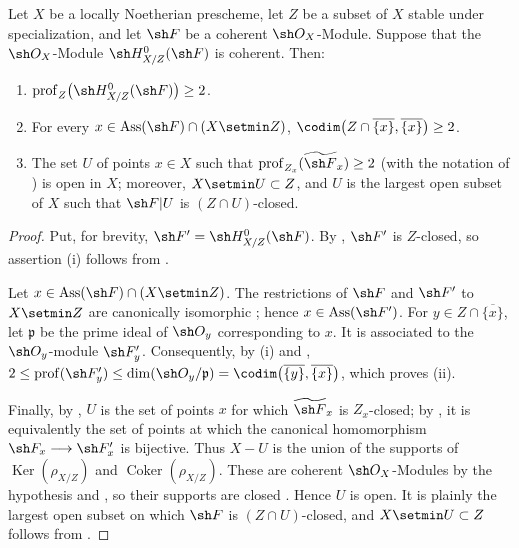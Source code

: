 \begin{proposition}[5.10.10]
\label{IV.5.10.10}
Let $X$ be a locally Noetherian prescheme, let $Z$ be a subset of
$X$ stable under specialization, and let $\sh F$ be a coherent
$\sh O_X$-Module.  Suppose that the $\sh O_X$-Module
$\sh H^0_{X/Z}(\sh F)$ is coherent.  Then:
\begin{enumerate}[{\rm(i)}]
  \item $\operatorname{prof}_Z\bigl(\sh H^0_{X/Z}(\sh F)\bigr)\geq2$.
  \item For every
  $x\in\operatorname{Ass}(\sh F)\cap(X\setmin Z)$, $\codim\bigl(Z\cap\overline{\{x\}},\overline{\{x\}}\bigr)
\geq2$.
  \item The set $U$ of points $x\in X$ such that $\operatorname{prof}_{Z_x}(\widetilde{\sh F}_x)\geq2$
  \textup{(with the notation of )} is open in $X$;
  moreover, $X\setmin U\subset Z$, and $U$ is the largest open subset of
  $X$ such that $\sh F|U$ is $(Z\cap U)$-closed.
\end{enumerate}
\end{proposition}


\begin{proof}
Put, for brevity, $\sh F'=\sh H^0_{X/Z}(\sh F)$.
By , $\sh F'$ is $Z$-closed, so assertion
{\rm(i)} follows from .

Let $x\in\operatorname{Ass}(\sh F)\cap(X\setmin Z)$.  The restrictions of
$\sh F$ and $\sh F'$ to $X\setmin Z$ are canonically isomorphic
; hence $x\in\operatorname{Ass}(\sh F')$.
For $y\in Z\cap\overline{\{x\}}$, let $\mathfrak p$ be the prime
ideal of $\sh O_y$ corresponding to $x$.  It is associated to the
$\sh O_y$-module $\sh F'_y$.  Consequently, by {\rm(i)} and
, $2\leq\operatorname{prof}(\sh F'_y)
\leq\dim(\sh O_y/\mathfrak p)
=\codim\bigl(\overline{\{y\}},\overline{\{x\}}\bigr)$,
which proves {\rm(ii)}.

Finally, by , $U$ is the set of points $x$ for
which $\widetilde{\sh F}_x$ is $Z_x$-closed; by
, it is equivalently the set of points at which
the canonical homomorphism $\sh F_x\longrightarrow\sh F'_x$
is bijective.  Thus $X-U$ is the union of the supports of
$\operatorname{Ker}(\rho_{X/Z})$ and
$\operatorname{Coker}(\rho_{X/Z})$.  These are coherent
$\sh O_X$-Modules by the hypothesis and , so
their supports are closed .  Hence $U$ is open.
It is plainly the largest open subset on which $\sh F$ is
$(Z\cap U)$-closed, and $X\setmin U\subset Z$ follows from
.
\end{proof}

